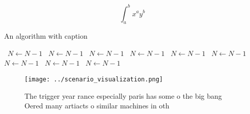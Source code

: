 \documentclass[a4paper]{article}
\begin{document}
\[ \int_{a}^{b}{x^{a}y^{b}} \]

\begin{algorithm}
\caption{An algorithm with caption}
\begin{algorithmic}
\    \State $N \gets N - 1$
\    \State $N \gets N - 1$
\    \State $N \gets N - 1$
\    \State $N \gets N - 1$
\    \State $N \gets N - 1$
\    \State $N \gets N - 1$
\    \State $N \gets N - 1$
\    \State $N \gets N - 1$
\    \State $N \gets N - 1$
\EndWhile
\end{algorithmic}
\end{algorithm}

\begin{figure}
\centering
\texttt{[image: ../scenario\_visualization.png]}
\caption{The trigger year rance especially paris has some o the big bang Oered many artiacts o similar machines in oth
}
\end{figure}
 
\end{document}
